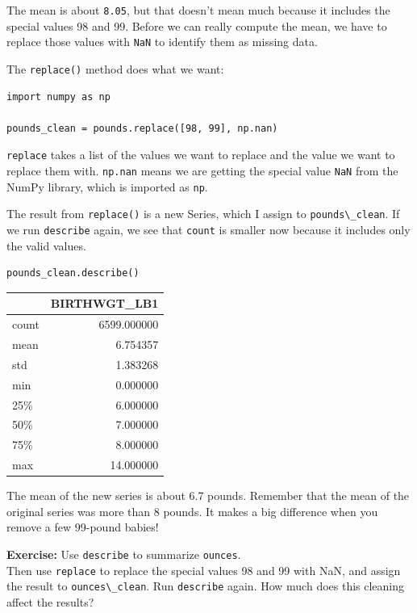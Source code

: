The mean is about \passthrough{\lstinline!8.05!}, but that doesn't mean
much because it includes the special values 98 and 99. Before we can
really compute the mean, we have to replace those values with
\passthrough{\lstinline!NaN!} to identify them as missing data.

The \passthrough{\lstinline!replace()!} method does what we want:

\begin{lstlisting}[]
import numpy as np

pounds_clean = pounds.replace([98, 99], np.nan)
\end{lstlisting}

\passthrough{\lstinline!replace!} takes a list of the values we want to
replace and the value we want to replace them with.
\passthrough{\lstinline!np.nan!} means we are getting the special value
\passthrough{\lstinline!NaN!} from the NumPy library, which is imported
as \passthrough{\lstinline!np!}.

The result from \passthrough{\lstinline!replace()!} is a new Series,
which I assign to \passthrough{\lstinline!pounds\_clean!}. If we run
\passthrough{\lstinline!describe!} again, we see that
\passthrough{\lstinline!count!} is smaller now because it includes only
the valid values.

\begin{lstlisting}[]
pounds_clean.describe()
\end{lstlisting}

\begin{tabular}{lr}
\midrule
{} &  BIRTHWGT\_LB1 \\
\midrule
count &   6599.000000 \\
mean  &      6.754357 \\
std   &      1.383268 \\
min   &      0.000000 \\
25\%   &      6.000000 \\
50\%   &      7.000000 \\
75\%   &      8.000000 \\
max   &     14.000000 \\
\midrule
\end{tabular}

The mean of the new series is about 6.7 pounds. Remember that the mean
of the original series was more than 8 pounds. It makes a big difference
when you remove a few 99-pound babies!

\textbf{Exercise:} Use \passthrough{\lstinline!describe!} to summarize
\passthrough{\lstinline!ounces!}.\\
Then use \passthrough{\lstinline!replace!} to replace the special values
98 and 99 with NaN, and assign the result to
\passthrough{\lstinline!ounces\_clean!}. Run
\passthrough{\lstinline!describe!} again. How much does this cleaning
affect the results?

